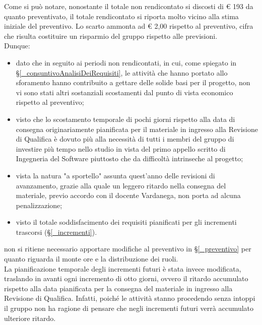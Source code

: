 Come si può notare, nonostante il totale non rendicontato si discosti di € 193 da quanto preventivato, il totale rendicontato si riporta molto vicino alla stima iniziale del preventivo. Lo scarto ammonta ad € 2,00 rispetto al preventivo, cifra che risulta costituire un risparmio del gruppo rispetto alle previsioni. \\
Dunque:
\begin{itemize}
	\item dato che in seguito ai periodi non rendicontati, in cui, come spiegato in \S\ref{_consuntivoAnalisiDeiRequisiti}, le attività che hanno portato allo sforamento hanno contribuito a gettare delle solide basi per il progetto, non vi sono stati altri sostanziali scostamenti dal punto di vista economico rispetto al preventivo;
	\item visto che lo scostamento temporale di pochi giorni rispetto alla data di consegna originariamente pianificata per il materiale in ingresso alla Revisione di Qualifica è dovuto più alla necessità di tutti i membri del gruppo di investire più tempo nello studio in vista del primo appello scritto di Ingegneria del Software piuttosto che da difficoltà intrinseche al progetto;
	\item vista la natura "a sportello" assunta quest'anno delle revisioni di avanzamento, grazie alla quale un leggero ritardo nella consegna del materiale, previo accordo con il docente Vardanega, non porta ad alcuna penalizzazione;  
	\item visto il totale soddisfacimento dei requisiti pianificati per gli incrementi trascorsi (\S\ref{_incrementi}).
\end{itemize}
  non si ritiene necessario apportare modifiche al preventivo in \S\ref{_preventivo} per quanto riguarda il monte ore e la distribuzione dei ruoli. \\
  La pianificazione temporale degli incrementi futuri è stata invece modificata, traslando in avanti ogni incremento di otto giorni, ovvero il ritardo accumulato rispetto alla data pianificata per la consegna del materiale in ingresso alla Revisione di Qualifica. Infatti, poiché le attività stanno procedendo senza intoppi il gruppo non ha ragione di pensare che negli incrementi futuri verrà accumulato ulteriore ritardo. 